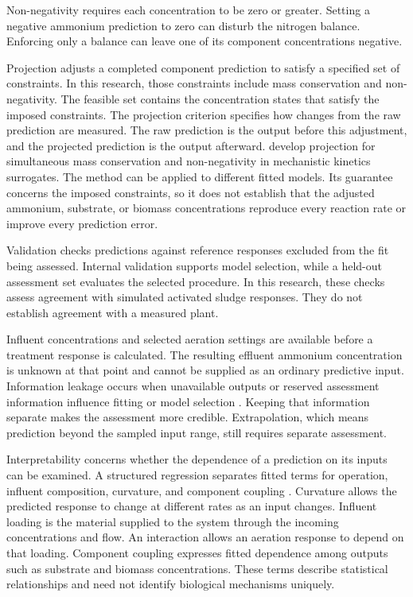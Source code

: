 Non-negativity requires each concentration to be zero or greater. Setting a negative ammonium prediction to zero can disturb the nitrogen balance. Enforcing only a balance can leave one of its component concentrations negative.

Projection adjusts a completed component prediction to satisfy a specified set of constraints. In this research, those constraints include mass conservation and non-negativity. The feasible set contains the concentration states that satisfy the imposed constraints. The projection criterion specifies how changes from the raw prediction are measured. The raw prediction is the output before this adjustment, and the projected prediction is the output afterward. \citet{KircherVotsmeier2025} develop projection for simultaneous mass conservation and non-negativity in mechanistic kinetics surrogates. The method can be applied to different fitted models. Its guarantee concerns the imposed constraints, so it does not establish that the adjusted ammonium, substrate, or biomass concentrations reproduce every reaction rate or improve every prediction error.

Validation checks predictions against reference responses excluded from the fit being assessed. Internal validation supports model selection, while a held-out assessment set evaluates the selected procedure. In this research, these checks assess agreement with simulated activated sludge responses. They do not establish agreement with a measured plant.

Influent concentrations and selected aeration settings are available before a treatment response is calculated. The resulting effluent ammonium concentration is unknown at that point and cannot be supplied as an ordinary predictive input. Information leakage occurs when unavailable outputs or reserved assessment information influence fitting or model selection \citep{Kaufman2012,Newhart2019}. Keeping that information separate makes the assessment more credible. Extrapolation, which means prediction beyond the sampled input range, still requires separate assessment.

Interpretability concerns whether the dependence of a prediction on its inputs can be examined. A structured regression separates fitted terms for operation, influent composition, curvature, and component coupling \citep{Rudin2019,Brunton2016}. Curvature allows the predicted response to change at different rates as an input changes. Influent loading is the material supplied to the system through the incoming concentrations and flow. An interaction allows an aeration response to depend on that loading. Component coupling expresses fitted dependence among outputs such as substrate and biomass concentrations. These terms describe statistical relationships and need not identify biological mechanisms uniquely.


